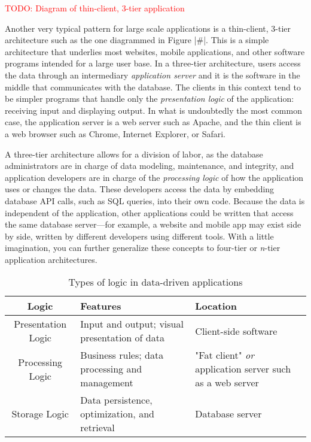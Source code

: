 \documentclass[11pt]{book}
\newcommand{\term}[1]{\emph{#1}} %
\newcommand{\head}[1]{\textnormal{\textbf{#1}}} %
\newcommand{\todo}[1]{\textcolor{red}{TODO: #1}} %
\begin{document}
\todo{Diagram of thin-client, 3-tier application}

Another very typical pattern for large scale applications is a thin-client, 3-tier architecture such as the one diagrammed in Figure |#|.  This is a simple architecture that underlies most websites, mobile applications, and other software programs intended for a large user base.  In a three-tier architecture, users access the data through an intermediary \term{application server} and it is the software in the middle that communicates with the database.  The clients in this context tend to be simpler programs that handle only the \term{presentation logic} of the application: receiving input and displaying output.  In what is undoubtedly the most common case, the application server is a web server such as Apache, and the thin client is a web browser such as Chrome, Internet Explorer, or Safari.

A three-tier architecture allows for a division of labor, as the database administrators are in charge of data modeling, maintenance, and integrity, and application developers are in charge of the \term{processing logic} of how the application uses or changes the data.  These developers access the data by embedding database API calls, such as SQL queries, into their own code.  Because the data is independent of the application, other applications could be written that access the same database server---for example, a website and mobile app may exist side by side, written by different developers using different tools.  With a little imagination, you can further generalize these concepts to four-tier or \emph{n}-tier application architectures.

\begin{table}
\centering
\caption{Types of logic in data-driven applications}\label{tab:applogic}
\vspace{10pt}
\begin{tabular}{cp{4cm}p{4.5cm}}
    \toprule[1.5pt]
    \head{Logic} & \head{Features} & \head{Location}\\
    \midrule
    Presentation Logic & Input and output; visual presentation of data & Client-side software \\
    \midrule
    Processing Logic & Business rules; data processing and management & "Fat client" \emph{or} application server such as a web server\\
    \midrule
    Storage Logic & Data persistence, optimization, and retrieval & Database server \\
    \bottomrule[1.5pt]
\end{tabular}
\end{table}
\end{document}
